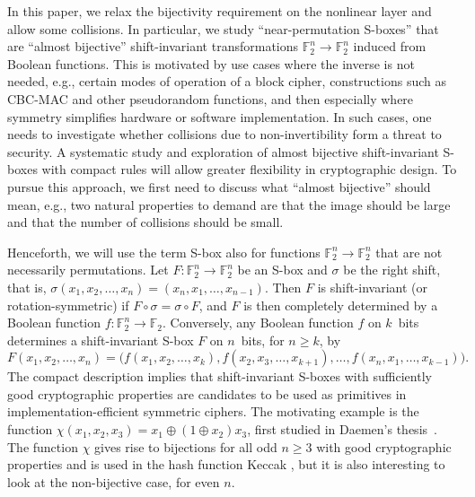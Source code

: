 \documentclass[11pt,english,a4paper]{amsart}
\theoremstyle{plain}
\theoremstyle{definition}
\theoremstyle{remark}
\newcommand{\F}{\mathbb{F}}
\begin{document}
	In this paper, we relax the bijectivity requirement on the nonlinear layer and allow some collisions. In particular, we study ``near-permutation S-boxes'' that are ``almost bijective'' shift-invariant transformations $\F_2^n \to \F_2^n$ induced from Boolean functions. This is motivated by use cases where the inverse is not needed, e.g., certain modes of operation of a block cipher, constructions such as CBC-MAC and other pseudorandom functions, and then especially where symmetry simplifies hardware or software implementation. In such cases, one needs to investigate whether collisions due to non-invertibility form a threat to security.   A systematic study and exploration of almost bijective shift-invariant S-boxes with compact rules will allow greater flexibility in cryptographic design.
    To pursue this approach, we first need to discuss what ``almost bijective'' should mean, e.g., two natural properties to demand are that the image should be large and that the number of collisions should be small.

    Henceforth, we will use the term S-box also for functions $\F_2^n \to \F_2^n$ that are not necessarily permutations.
	Let $F\colon\F_2^n\to\F_2^n$ be an S-box and $\sigma$ be the right shift, that is, $\sigma(x_1,x_2,\ldots,x_n)=(x_n,x_1,\ldots,x_{n-1})$.
	Then $F$ is shift-invariant (or rotation-symmetric) if $F\circ \sigma=\sigma\circ F$, and $F$ is then completely determined by a Boolean function $f\colon\F_2^n\to\F_2$. %
    Conversely, any Boolean function $f$ on $k$~bits determines a shift-invariant S-box $F$ on $n$~bits, for $n\geq k$, by
 \[
F(x_1,x_2,\dotsc,x_{n})=\big(f(x_1,x_2,\dotsc,x_{k}),f(x_2,x_3,\dotsc,x_{k+1}), \dotsc,f(x_n,x_1,\dotsc,x_{k-1})\big).
\]
    The compact description implies that shift-invariant S-boxes with sufficiently good cryptographic properties are candidates to be used as primitives in implementation-efficient symmetric ciphers.
	The motivating example is the function $\chi(x_1,x_2,x_3)=x_1\oplus (1\oplus x_2)x_3$, first studied in Daemen's thesis~\cite{JDA-thesis}. The function $\chi$ gives rise to bijections for all odd $n\geq 3$ with good cryptographic properties and is used in the hash function Keccak \cite{keccak}, but it is also interesting to look at the non-bijective case, for even $n$.
	
\end{document}
